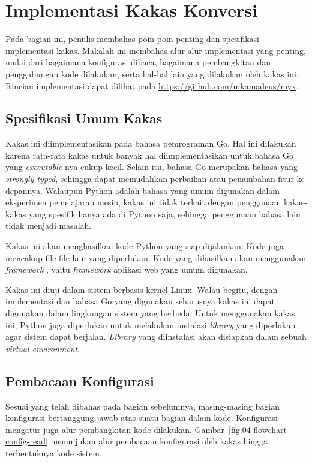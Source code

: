 \section{Implementasi Kakas Konversi}

Pada bagian ini, penulis membahas poin-poin penting dan spesifikasi implementasi kakas.
Makalah ini membahas alur-alur implementasi yang penting, mulai dari bagaimana konfigurasi dibaca, bagaimana pembangkitan dan penggabungan kode dilakukan, serta hal-hal lain yang dilakukan oleh kakas ini.
Rincian implementasi dapat dilihat pada \url{https://github.com/mkamadeus/myx}.

\subsection{Spesifikasi Umum Kakas}

Kakas ini diimplementasikan pada bahasa pemrograman Go.
Hal ini dilakukan karena rata-rata kakas untuk banyak hal diimplementasikan untuk bahasa Go yang \textit{executable}-nya cukup kecil.
Selain itu, bahasa Go merupakan bahasa yang \textit{strongly typed}, sehingga dapat memudahkan perbaikan atau penambahan fitur ke depannya.
Walaupun Python adalah bahasa yang umum digunakan dalam eksperimen pemelajaran mesin, kakas ini tidak terkait dengan penggunaan kakas-kakas yang spesifik hanya ada di Python saja, sehingga penggunaan bahasa lain tidak menjadi masalah.

Kakas ini akan menghasilkan kode Python yang siap dijalankan.
Kode juga mencakup file-file lain yang diperlukan.
Kode yang dihasilkan akan menggunakan \textit{framework} , yaitu \textit{framework} aplikasi web yang umum digunakan.

Kakas ini diuji dalam sistem berbasis kernel Linux.
Walau begitu, dengan implementasi dan bahasa Go yang digunakan seharusnya kakas ini dapat digunakan dalam lingkungan sistem yang berbeda.
Untuk menggunakan kakas ini, Python juga diperlukan untuk melakukan instalasi \textit{library} yang diperlukan agar sistem dapat berjalan.
\textit{Library} yang diinstalasi akan disiapkan dalam sebuah \textit{virtual environment}.

\subsection{Pembacaan Konfigurasi}

Sesuai yang telah dibahas pada bagian sebelumnya, masing-masing bagian konfigurasi bertanggung jawab atas suatu bagian dalam kode.
Konfigurasi mengatur juga alur pembangkitan kode dilakukan.
Gambar~\ref{fig:04-flowchart-config-read} menunjukan alur pembacaan konfigurasi oleh kakas hingga terbentuknya kode sistem.

